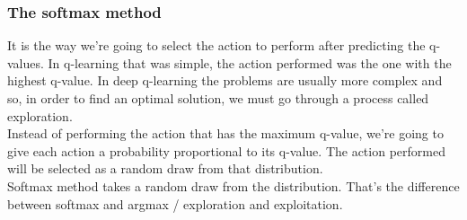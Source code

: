 \documentclass[french]{article}
\begin{document}
\subsubsection{The softmax method}
It is the way we're going to select the action to perform after predicting the q-values. In q-learning that was simple, the action performed was the one with the highest q-value. In deep q-learning the problems are usually more complex and so, in order to find an optimal solution, we must go through a process called exploration. \\
Instead of performing the action that has the maximum q-value, we're going to give each action a probability proportional to its q-value. The action performed will be selected as a random draw from that distribution. \\
Softmax method takes a random draw from the distribution. That's the difference between softmax and argmax / exploration and exploitation.
\end{document}
